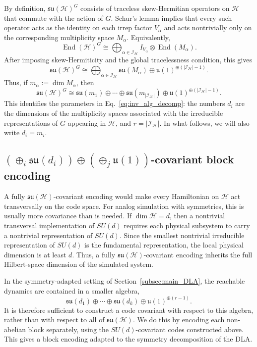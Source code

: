 \documentclass[10pt,twocolumn,superscriptaddress,aps,amsmath,amssymb,citeautoscript,floatfix,prx,longbibliography]{revtex4-2}
\newcounter{alg}
\theoremstyle{plain}
\theoremstyle{plain}
\theoremstyle{plain}
\theoremstyle{plain}
\theoremstyle{plain}
\theoremstyle{plain}
\begin{document}
By definition, $\mathfrak{su}(\mathcal H)^G$ consists of traceless skew-Hermitian operators on $\mathcal H$ that commute with the action of $G$. Schur's lemma implies that every such operator acts as the identity on each irrep factor $V_\alpha$ and acts nontrivially only on the corresponding multiplicity space $M_\alpha$. Equivalently,
$$
    \operatorname{End}(\mathcal H)^G
    \cong
    \bigoplus_{\alpha\in\mathcal I_{\mathcal H}}
    I_{V_\alpha}
    \otimes
    \operatorname{End}(M_\alpha).
$$
After imposing skew-Hermiticity and the global tracelessness condition, this gives
$$
    \mathfrak{su}(\mathcal H)^G
    \cong
    \bigoplus_{\alpha\in\mathcal I_{\mathcal H}}
    \mathfrak{su}(M_\alpha)
    \oplus
    \mathfrak{u}(1)^{\oplus(|\mathcal I_{\mathcal H}|-1)} .
$$
Thus, if $m_\alpha:=\dim M_\alpha$, then
$$
    \mathfrak{su}(\mathcal H)^G
    \cong
    \mathfrak{su}(m_1)
    \oplus
    \cdots
    \oplus
    \mathfrak{su}(m_{|\mathcal I_{\mathcal H}|})
    \oplus
    \mathfrak{u}(1)^{\oplus(|\mathcal I_{\mathcal H}|-1)} .
$$
This identifies the parameters in Eq.~\eqref{eq:inv_alg_decomp}: the numbers $d_i$ are the dimensions of the multiplicity spaces associated with the irreducible representations of $G$ appearing in $\mathcal H$, and $r=|\mathcal I_{\mathcal H}|$. In what follows, we will also write $d_i=m_i$.

\subsection{\texorpdfstring{$\left(\oplus_i \mathfrak{s}\mathfrak{u}\left(d_i\right)\right)
\oplus\left(\oplus_j \mathfrak{u}(1)\right)$}{(sum i su(d i)) plus (sum j u(1))}-covariant block encoding}
\label{subsec:main_covar_block_enc}

A fully $\mathfrak{su}(\mathcal H)$-covariant encoding would make every Hamiltonian on $\mathcal H$ act transversally on the code space. For analog simulation with symmetries, this is usually more covariance than is needed. If $\dim\mathcal H=d$, then a nontrivial transversal implementation of $SU(d)$ requires each physical subsystem to carry a nontrivial representation of $SU(d)$. Since the smallest nontrivial irreducible representation of $SU(d)$ is the fundamental representation, the local physical dimension is at least $d$. Thus, a fully $\mathfrak{su}(\mathcal H)$-covariant encoding inherits the full Hilbert-space dimension of the simulated system.

In the symmetry-adapted setting of Section~\ref{subsec:main_DLA}, the reachable dynamics are contained in a smaller algebra,
$$
    \mathfrak{su}(d_1)
    \oplus
    \cdots
    \oplus
    \mathfrak{su}(d_k)
    \oplus
    \mathfrak{u}(1)^{\oplus(r-1)} .
$$
It is therefore sufficient to construct a code covariant with respect to this algebra, rather than with respect to all of $\mathfrak{su}(\mathcal H)$. We do this by encoding each non-abelian block separately, using the $SU(d)$-covariant codes constructed above. This gives a block encoding adapted to the symmetry decomposition of the DLA.
\end{document}
